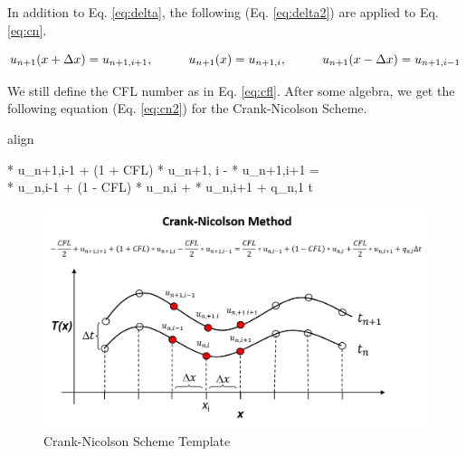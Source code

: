 \documentclass[10pt, letter, showtrims]{extarticle}
\newcommand{\boxedeq}[2]{\begin{empheq}[box={\fboxsep=6pt\fbox}]{align}\label{#1}#2\end{empheq}}
\begin{document}
%		
		
		\noindent
		In addition to Eq. \ref{eq:delta}, the following (Eq. \ref{eq:delta2}) are applied to Eq. \ref{eq:cn}.
		
		\begin{equation}
		\label{eq:delta2}
			u_{n+1}(x + \Delta x) = u_{n+1,i+1}, \hphantom{xxxxx} u_{n+1}(x) = u_{n+1,i}, \hphantom{xxxxx} u_{n+1}(x - \Delta x) = u_{n+1,i-1}
		\end{equation}
		
		\noindent
		We still define the CFL number as in Eq. \ref{eq:cfl}. After some algebra, we get the following equation (Eq. \ref{eq:cn2}) for the Crank-Nicolson Scheme.
		
%		
%		
		
		\boxedeq{eq:cn2}{\begin{split} * u_{n+1,i-1} + (1 + CFL) * u_{n+1, i} - \frac{CFL}{2} * u_{n+1,i+1} = \\ \frac{CFL}{2} * u_{n,i-1} + (1 - CFL) * u_{n,i} + \frac{CFL}{2} * u_{n,i+1} + q_{n,1} \Delta t\end{split}}
		
		\FloatBarrier
		\begin{figure}[h]
			\centering
			\captionsetup{justification=centering}
			\includegraphics[width=0.65\linewidth]{"Figures/Crank_Nicolson_Method"}
			\caption{Crank-Nicolson Scheme Template}
			\label{fig:cn}
		\end{figure}
		\FloatBarrier
		
\end{document}
